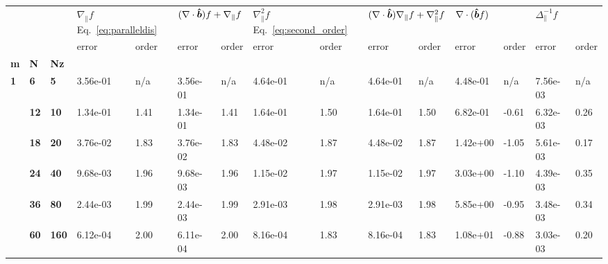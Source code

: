 \begin{tabular}{lllllllllllllll}
\toprule
  &     &     & \multicolumn{2}{l}{$\nabla_\parallel f$
  Eq.~\eqref{eq:paralleldis}} & \multicolumn{2}{l}{$(\nabla\cdot\bm{\hat{b}}) f +
  \nabla_\parallel f$} &
  \multicolumn{2}{l}{$\nabla_\parallel^2 f$ Eq.~\eqref{eq:second_order}} &
  \multicolumn{2}{l}{$(\nabla\cdot\bm{\hat{b}})\nabla_\parallel f + \nabla_\parallel^2
  f$} & \multicolumn{2}{l}{$\nabla\cdot(\bm{\hat{b}} f)$} &
  \multicolumn{2}{l}{$\Delta_\parallel^{-1}f $} \\
  &    &     &     error & order &             error & order &     error & order &     error & order &       error &  order &          error & order \\
\textbf{m} & \textbf{N} & \textbf{Nz} &           &       &                   &       &           &       &           &       &             &        &                &       \\
\midrule
\textbf{1} & \textbf{6 } & \textbf{5  } &  3.56e-01 &   n/a &          3.56e-01 &   n/a &  4.64e-01 &   n/a &  4.64e-01 &   n/a &    4.48e-01 &    n/a &       7.56e-03 &   n/a \\
  & \textbf{12} & \textbf{10 } &  1.34e-01 &  1.41 &          1.34e-01 &  1.41 &  1.64e-01 &  1.50 &  1.64e-01 &  1.50 &    6.82e-01 &  -0.61 &       6.32e-03 &  0.26 \\
  & \textbf{18} & \textbf{20 } &  3.76e-02 &  1.83 &          3.76e-02 &  1.83 &  4.48e-02 &  1.87 &  4.48e-02 &  1.87 &    1.42e+00 &  -1.05 &       5.61e-03 &  0.17 \\
  & \textbf{24} & \textbf{40 } &  9.68e-03 &  1.96 &          9.68e-03 &  1.96 &  1.15e-02 &  1.97 &  1.15e-02 &  1.97 &    3.03e+00 &  -1.10 &       4.39e-03 &  0.35 \\
  & \textbf{36} & \textbf{80 } &  2.44e-03 &  1.99 &          2.44e-03 &  1.99 &  2.91e-03 &  1.98 &  2.91e-03 &  1.98 &    5.85e+00 &  -0.95 &       3.48e-03 &  0.34 \\
  & \textbf{60} & \textbf{160} &  6.12e-04 &  2.00 &          6.11e-04 &  2.00 &  8.16e-04 &  1.83 &  8.16e-04 &  1.83 &    1.08e+01 &  -0.88 &       3.03e-03 &  0.20 \\
\bottomrule
\end{tabular}
